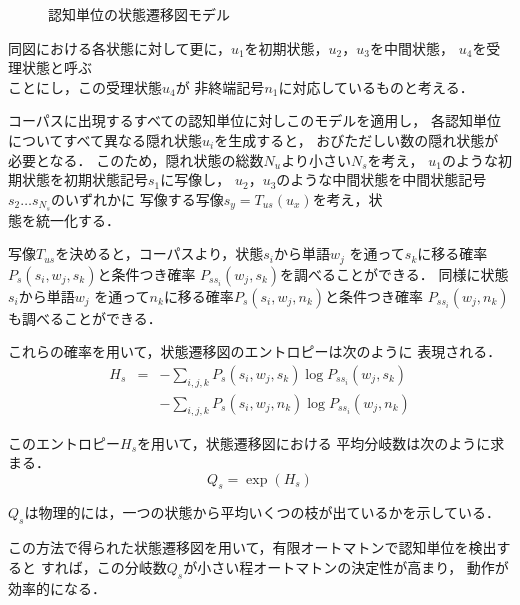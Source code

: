 \begin{figure}[b]
\begin{center}

\end{center}
\caption{認知単位の状態遷移図モデル} \label{zu5}
\end{figure}



同図における各状態に対して更に，\hspace*{-1mm}$u_1$を初期状態，$u_2$，$u_3$を中間状態，
$u_4$を受理状態と呼ぶ\\ことにし，この受理状態$u_4$が
非終端記号$n_1$に対応しているものと考える．

コーパスに出現するすべての認知単位に対しこのモデルを適用し，
各認知単位についてすべて異なる隠れ状態$u_i$を生成すると，
おびただしい数の隠れ状態が必要となる．
このため，隠れ状態の総数$N_u$より小さい$N_s$を考え，
\hspace*{-2mm}$u_1$のような初期状態を初期状態記号$s_1$に写像し，\hspace*{-1mm}
$u_2$，\hspace*{-1mm}$u_3$のような中間状態を中間状態記号$s_2\ldots s_{N_s}$のいずれかに
写像する写像$s_y = T_{us}(u_x)$を考え，状\\態を統一化する．

写像$T_{us}$を決めると，コーパスより，状態$s_i$から単語$w_j$
を通って$s_k$に移る確率$P_s(s_i, w_j, s_k)$と条件つき確率
$P_{s s_i}(w_j, s_k)$を調べることができる．
同様に状態$s_i$から単語$w_j$
を通って$n_k$に移る確率$P_s(s_i, w_j, n_k)$と条件つき確率
$P_{s s_i}(w_j, n_k)$も調べることができる．

これらの確率を用いて，状態遷移図のエントロピーは次のように
表現される．
\begin{eqnarray}
H_s & = & - \sum_{i,j,k} P_s(s_i, w_j, s_k) \log P_{s s_i}(w_j, s_k) \nonumber \\
& & - \sum_{i,j,k} P_s(s_i, w_j, n_k) \log P_{s s_i}(w_j, n_k) \label{eq7}
\end{eqnarray}

このエントロピー$H_s$を用いて，状態遷移図における
平均分岐数は次のように求まる．
\begin{equation}
Q_s = \exp (H_s) \label{eq8}
\end{equation}

$Q_s$は物理的には，一つの状態から平均いくつの枝が出ているかを示している．

この方法で得られた状態遷移図を用いて，有限オートマトンで認知単位を検出すると
すれば，この分岐数$Q_s$が小さい程オートマトンの決定性が高まり，
動作が効率的になる．

